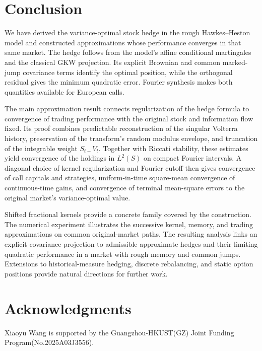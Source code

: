 \documentclass[11pt]{article}
\theoremstyle{definition}
\theoremstyle{remark}
\newcommand{\1}{\mathbf{1}}
\begin{document}
\section{Conclusion}
\label{sec:conclusion}

We have derived the variance-optimal stock hedge in the rough
Hawkes--Heston model and constructed approximations whose performance
converges in that same market. The hedge follows from the model's affine
conditional martingales and the classical GKW projection. Its explicit
Brownian and common marked-jump covariance terms identify the optimal
position, while the orthogonal residual gives the minimum quadratic error.
Fourier synthesis makes both quantities available for European calls.

The main approximation result connects regularization of the hedge formula
to convergence of trading performance with the original stock and
information flow fixed. Its proof combines predictable reconstruction of
the singular Volterra history, preservation of the transform's random
modulus envelope, and truncation of the integrable weight $S_{t-}V_t$.
Together with Riccati stability, these estimates yield convergence of the
holdings in $L^2(S)$ on compact Fourier intervals. A diagonal choice of
kernel regularization and Fourier cutoff then gives convergence of call
capitals and strategies, uniform-in-time square-mean convergence of
continuous-time gains, and convergence of terminal mean-square errors to
the original market's variance-optimal value.

Shifted fractional kernels provide a concrete family covered by the
construction. The numerical experiment illustrates the successive kernel,
memory, and trading approximations on common original-market paths. The
resulting analysis links an explicit covariance projection to admissible
approximate hedges and their limiting quadratic performance in a market
with rough memory and common jumps. Extensions to historical-measure
hedging, discrete rebalancing, and static option positions provide natural
directions for further work.

\section*{Acknowledgments}
Xiaoyu Wang is supported by the Guangzhou-HKUST(GZ) Joint Funding Program\linebreak (No.2025A03J3556).




\end{document}
